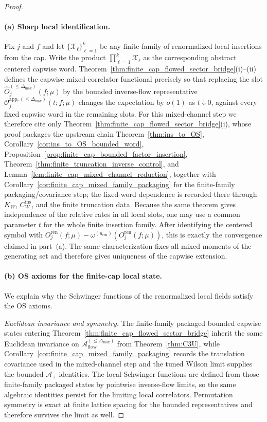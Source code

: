 \begin{proof}
\paragraph{(a) Sharp local identification.}
Fix $j$ and $f$ and let $\{\mathcal X_\ell\}_{\ell=1}^k$ be any finite family of renormalized local insertions from the cap.
Write the product $\prod_{\ell=1}^k \mathcal X_\ell$ as the corresponding abstract centered capwise word.
Theorem~\ref{thm:finite_cap_flowed_sector_bridge}(i)--(ii) defines the capwise mixed-correlator functional precisely so that replacing the slot
$\widehat O_j^{(\le \Delta_{\max})}(f;\mu)$ by the bounded inverse-flow representative
$\mathcal O_j^{\mathrm{app},(\le \Delta_{\max})}(t;f;\mu)$ changes the expectation by $o(1)$ as $t\downarrow 0$, against every fixed capwise word in the remaining slots.
For this mixed-channel step we therefore cite only Theorem~\ref{thm:finite_cap_flowed_sector_bridge}(i), whose proof packages the upstream chain Theorem~\ref{thm:ins_to_OS}, Corollary~\ref{cor:ins_to_OS_bounded_word}, Proposition~\ref{prop:finite_cap_bounded_factor_insertion}, Theorem~\ref{thm:finite_truncation_inverse_control}, and Lemma~\ref{lem:finite_cap_mixed_channel_reduction}, together with Corollary~\ref{cor:finite_cap_mixed_family_packaging} for the finite-family packaging/covariance step; the fixed-word dependence is recorded there through $K_W$, $C_W^{\mathrm{ins}}$, and the finite truncation data.
Because the same theorem gives independence of the relative rates in all local slots, one may use a common parameter $t$ for the whole finite insertion family.
After identifying the centered symbol with
$O_j^{\mathrm{ren}}(f;\mu)-\omega^{(u_{\mathrm{ren}})}(O_j^{\mathrm{ren}}(f;\mu))$, this is exactly the convergence claimed in part~(a).
The same characterization fixes all mixed moments of the generating set and therefore gives uniqueness of the capwise extension.

\paragraph{(b) OS axioms for the finite-cap local state.}
We explain why the Schwinger functions of the renormalized local fields satisfy the OS axioms.

\emph{Euclidean invariance and symmetry.}
The finite-family packaged bounded capwise states entering Theorem~\ref{thm:finite_cap_flowed_sector_bridge} inherit the same Euclidean invariance on $\mathcal A_{\mathrm{flow}}^{(\le \Delta_{\max})}$ from Theorem~\ref{thm:C3U}, while Corollary~\ref{cor:finite_cap_mixed_family_packaging} records the translation covariance used in the mixed-channel step and the tuned Wilson limit supplies the bounded $\mathcal A_+$ identities.
The local Schwinger functions are defined from those finite-family packaged states by pointwise inverse-flow limits, so the same algebraic identities persist for the limiting local correlators.
Permutation symmetry is exact at finite lattice spacing for the bounded representatives and therefore survives the limit as well.


\end{proof}
